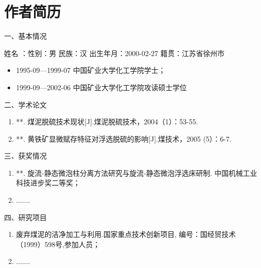 \newpage
{}
\section*{\hspace*{\fill}作者简历\hspace*{\fill}}
\vspace{12pt}

\makeatletter
{
	\heiti{} 
	\noindent 一、基本情况 \par
}
{
	姓名 ：\@author \quad 性别：男 \quad 民族：汉 \quad 出生年月：2000-02-27 \quad 籍贯：江苏省徐州市 \par
	\begin{itemize}
		\setlength{\itemindent}{5.4em}
		\item[] 1995-09—1999-07  中国矿业大学化工学院学士；
		\item[] 1999-09—2002-06  中国矿业大学化工学院攻读硕士学位
	\end{itemize}
}

{
	\heiti{} 
	\noindent 二、学术论文 \par
}
{
	\begin{enumerate}
		\setlength{\itemindent}{-1.5em}
		\item **. 煤泥脱硫技术现状[J].煤泥脱硫技术，2004（1）：53-55.
		\item **. 黄铁矿显微赋存特征对浮选脱硫的影响[J].煤技术，2005 (5）：6-7.
	\end{enumerate}
}

{
	\heiti{} 
	\noindent 三、获奖情况 \par
}
{
	\begin{enumerate}
		\setlength{\itemindent}{-1.5em}
		\item **. 旋流-静态微泡柱分离方法研究与旋流-静态微泡浮选床研制. 中国机械工业科技进步奖二等奖；
		\item .......
	\end{enumerate}
}
{
	\heiti{} 
	\noindent 四、研究项目 \par
}
{
	\begin{enumerate}
		\setlength{\itemindent}{-1.5em}
		\item 废弃煤泥的洁净加工与利用.国家重点技术创新项目, 编号：国经贸技术（1999）598号,参加人员；
		\item .......
	\end{enumerate}
}